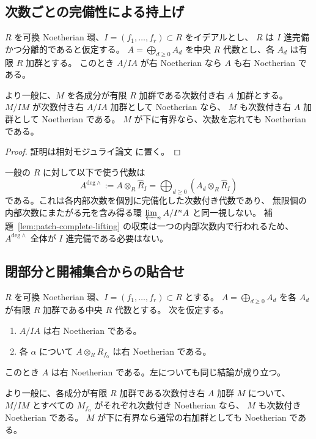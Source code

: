 \subsection{次数ごとの完備性による持上げ}

\begin{lemma}[完備基底上の持上げ]
\label{lem:patch-complete-lifting}
$R$ を可換 Noetherian 環、$I=(f_1,\ldots,f_r)\subset R$ をイデアルとし、
$R$ は $I$ 進完備かつ分離的であると仮定する。
$A=\bigoplus_{d\geq0}A_d$ を中央 $R$ 代数とし、各 $A_d$ は有限 $R$ 加群とする。
このとき $A/IA$ が右 Noetherian なら $A$ も右 Noetherian である。

より一般に、$M$ を各成分が有限 $R$ 加群である次数付き右 $A$ 加群とする。
$M/IM$ が次数付き右 $A/IA$ 加群として Noetherian なら、
$M$ も次数付き右 $A$ 加群として Noetherian である。
$M$ が下に有界なら、次数を忘れても Noetherian である。
\end{lemma}

\begin{proof}
証明は相対モジュライ論文 \cite[\texttt{relative_noetherian_patching}]{QuadricModuli2026} に置く。
\end{proof}

\begin{remark}[全体の完備化との区別]
一般の $R$ に対して以下で使う代数は
\[
 A^{\mathrm{deg}\wedge}
 :=A\otimes_R\widehat R_I
 =\bigoplus_{d\geq0}(A_d\otimes_R\widehat R_I)
\]
である。これは各内部次数を個別に完備化した次数付き代数であり、
無限個の内部次数にまたがる元を含み得る環
$\varprojlim_n A/I^nA$ と同一視しない。
補題~\ref{lem:patch-complete-lifting} の収束は一つの内部次数内で行われるため、
$A^{\mathrm{deg}\wedge}$ 全体が $I$ 進完備である必要はない。
\end{remark}

\subsection{閉部分と開補集合からの貼合せ}

\begin{theorem}
\label{thm:patch-noetherian}
$R$ を可換 Noetherian 環、$I=(f_1,\ldots,f_r)\subset R$ とする。
$A=\bigoplus_{d\geq0}A_d$ を各 $A_d$ が有限 $R$ 加群である中央 $R$ 代数とする。
次を仮定する。
\begin{enumerate}
 \item $A/IA$ は右 Noetherian である。
 \item 各 $\alpha$ について $A\otimes_R R_{f_\alpha}$ は右 Noetherian である。
\end{enumerate}
このとき $A$ は右 Noetherian である。左についても同じ結論が成り立つ。

より一般に、各成分が有限 $R$ 加群である次数付き右 $A$ 加群 $M$ について、
$M/IM$ とすべての $M_{f_\alpha}$ がそれぞれ次数付き Noetherian なら、
$M$ も次数付き Noetherian である。
$M$ が下に有界なら通常の右加群としても Noetherian である。
\end{theorem}

